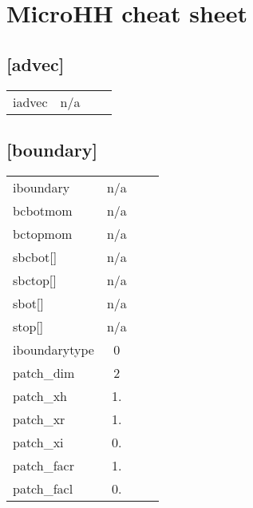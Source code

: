 \documentclass[a4paper,10pt]{extarticle}
\begin{document}
\section*{MicroHH cheat sheet}
\subsection*{[advec]}
\tablelasttail{\hline}
\begin{supertabular}{lcll}
iadvec        & n/a   & \\
\end{supertabular}
\subsection*{[boundary]}
\tablelasttail{\hline}
\begin{supertabular}{lcll}
iboundary     & n/a   & \\
bcbotmom      & n/a   & \\
bctopmom      & n/a   & \\
sbcbot[]      & n/a   & \\
sbctop[]      & n/a   & \\
sbot[]        & n/a   & \\
stop[]        & n/a   & \\
iboundarytype & 0     & \\
patch\_dim    & 2     & \\
patch\_xh     & 1.    & \\
patch\_xr     & 1.    & \\
patch\_xi     & 0.    & \\
patch\_facr   & 1.    & \\
patch\_facl   & 0.    & \\
\end{supertabular}
\end{document}
